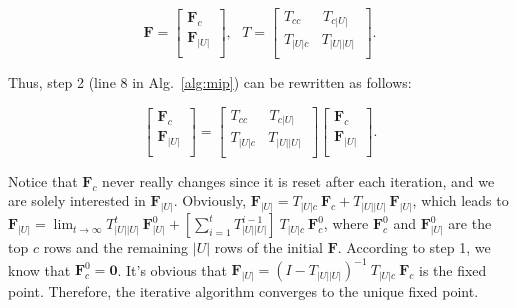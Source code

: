 \documentclass{llncs}
\begin{document}
\vspace*{-0.25cm}
\begin{small}
\begin{equation*}
    \mathbf{F} = \left[
        \begin{aligned}
          \mathbf{F}_c~~~\\
          \mathbf{F}_{|U|}\\
        \end{aligned}
    \right], ~~~
    T =
    \left[
        \begin{aligned}
            T_{cc}~~~~~~~T_{c{|U|}}~~~\\
            T_{{|U|}c}~~~~T_{{|U|}{|U|}}\\
        \end{aligned}
    \right] .
\end{equation*}\end{small}
\vspace*{-0.25cm}

Thus, step 2 (line 8 in Alg.~\ref{alg:mip}) can be rewritten  as follows:

\vspace*{-0.3cm}
\begin{small}
 \begin{equation*}
    \left[
        \begin{aligned}
          \mathbf{F}_c~~~\\
          \mathbf{F}_{|U|}\\
        \end{aligned}
    \right]
    =
    \left[
        \begin{aligned}
            T_{cc}~~~~~~~T_{c{|U|}}~~~\\
            T_{{|U|}c}~~~~T_{{|U|}{|U|}}\\
        \end{aligned}
    \right]
    \left[
        \begin{aligned}
          \mathbf{F}_c~~~\\
          \mathbf{F}_{|U|}\\
        \end{aligned}
    \right] .
\end{equation*}\end{small}
\vspace*{-0.3cm}

Notice that $\mathbf{F}_c$ never really changes since it is reset after each iteration, and we are solely interested in $\mathbf{F}_{|U|}$.  Obviously, $\mathbf{F}_{|U|} =  T_{{|U|}c}~\mathbf{F}_c +  T_{{|U|}{|U|}} ~ \mathbf{F}_{|U|}$, which leads to
$\mathbf{F}_{|U|} = \lim _{t\rightarrow \infty}  T_{{|U|}{|U|}} ^{t} ~ \mathbf{F}_{|U|} ^{0} + [\sum _{i=1}^{t}
T_{{|U|}{|U|}}^{i-1}]~T_{{|U|}c} ~ \mathbf{F}_c ^{0}$, where $\mathbf{F}_c ^{0}$ and $\mathbf{F}_{|U|} ^{0}$ are the top $c$ rows and the remaining ${|U|}$ rows of the initial $\mathbf{F}$.  According to step 1, we know that $\mathbf{F}_c ^{0} = \mathbf{0}$.
It's obvious that $\mathbf{F}_{|U|} = (I-T_{{|U|}{|U|}})^{-1}~T_{{|U|}c}~\mathbf{F}_c$ is the fixed point. Therefore, the iterative algorithm converges to the unique fixed point.
\end{document}

